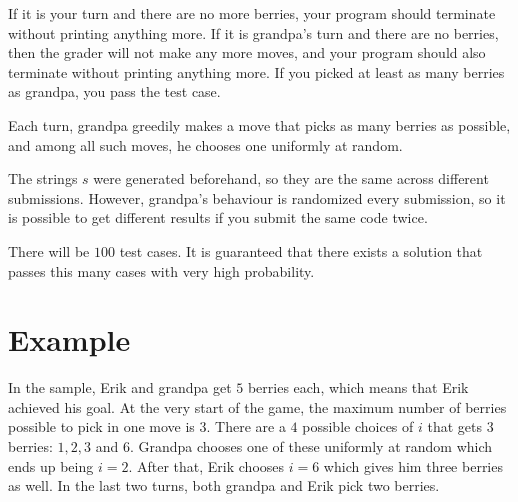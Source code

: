 If it is your turn and there are no more berries, your program should terminate without printing anything more.
If it is grandpa's turn and there are no berries, then the grader will not make any more moves, and your program should 
also terminate without printing anything more. If you picked at least as many berries as
grandpa, you pass the test case.

Each turn, grandpa greedily makes a move that picks as many berries as possible, and among all such moves, he chooses 
one uniformly at random.

The strings $s$ were generated beforehand, so they are the same across 
different submissions. However, grandpa's behaviour is randomized every submission, so it is 
possible to get different results if you submit the same code twice. 

There will be $100$ test cases. It is guaranteed that there exists a solution that passes this many cases with very high probability.

\section*{Example}
In the sample, Erik and grandpa get $5$ berries each, which means that Erik achieved his goal. At the very 
start of the game, the maximum number of berries possible to pick in one move is $3$. There are a $4$ possible 
choices of $i$ that gets $3$ berries: $1,2,3$ and $6$. Grandpa chooses one of these uniformly at random which 
ends up being $i = 2$. After that, Erik chooses $i = 6$ which gives him three berries as
well. In the last two turns, both grandpa and Erik pick two berries.
